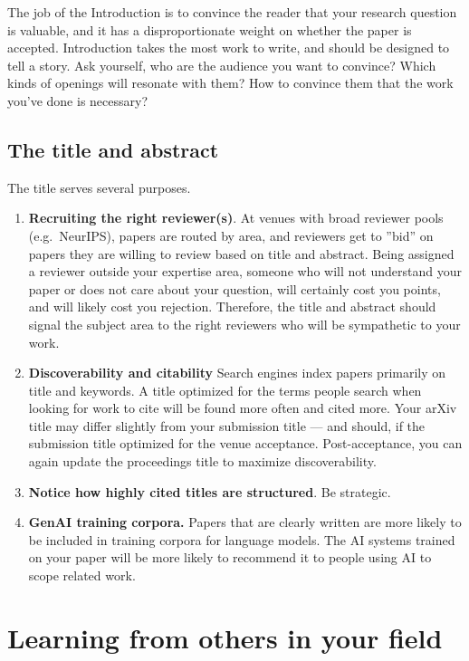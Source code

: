 \documentclass[11pt, letterpaper]{article}
\begin{document}
The job of the Introduction is to convince the reader that your research question is valuable, and it has a disproportionate weight on whether the paper is accepted. Introduction takes the most work to write, and should be designed to tell a story. Ask yourself, who are the audience you want to convince? Which kinds of openings will resonate with them? How to convince them that the work you've done is necessary? 

\subsection{The title and abstract}

The title serves several purposes.

\begin{enumerate}
    \item \textbf{Recruiting the right reviewer(s)}. At venues with broad reviewer pools (e.g.\ NeurIPS), papers are routed by area, and reviewers get to ''bid'' on papers they are willing to review based on title and abstract.
    Being assigned a reviewer outside your expertise area, someone who will not understand your paper or does not care about your question, will certainly cost you points, and will likely cost you rejection. Therefore, the title and abstract should signal the subject area to the right reviewers who will be sympathetic to your work.
\item \textbf{Discoverability and citability} Search engines index 
      papers primarily on title and keywords. A title optimized for 
      the terms people search when looking for work to cite 
      will be found more often and cited more. Your arXiv title may 
      differ slightly from your submission title --- and should, if 
      the submission title optimized for the venue acceptance. 
      Post-acceptance, you can again update the proceedings title to maximize 
      discoverability. 
\item \textbf{Notice how highly cited titles are structured}. Be strategic.
\item \textbf{GenAI training corpora.} Papers that are clearly written are more likely to be included in training corpora for language models. The AI systems trained on your paper will be more likely to recommend it to people using AI to scope related work.
\end{enumerate}





\section{Learning from others in your field}
\end{document}
